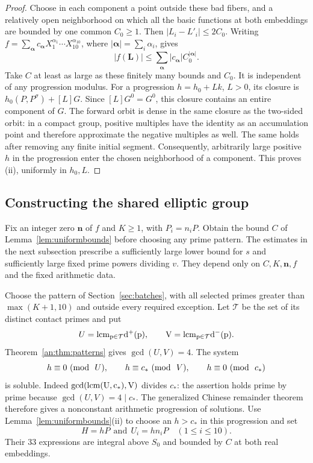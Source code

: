 \documentclass[11pt,reqno]{amsart}
\theoremstyle{definition}
\numberwithin{equation}{section}
\newcommand{\lcm}{\operatorname{lcm}}
\def\t{\text}
\def\mo{{\rm{mod}\ }}
\def\pmod#1{\ (\mo\ #1)}
\def\lcm{\rm{lcm}}
\begin{document}
\begin{proof}
Choose in each component a point outside these bad fibers, and a relatively open neighborhood on which all the basic functions at both embeddings are bounded by one common $C_0\ge1$. Then $|L_i-L'_i|\le2C_0$. Writing $f=\sum_{\boldsymbol\alpha}c_{\boldsymbol\alpha}X_1^{\alpha_1}\cdots X_{10}^{\alpha_{10}}$, where $|\boldsymbol\alpha|=\sum_i\alpha_i$, gives
\[
 |f(\mathbf L)|\le\sum_{\boldsymbol\alpha}|c_{\boldsymbol\alpha}|C_0^{|\boldsymbol\alpha|}.
\]
Take $C$ at least as large as these finitely many bounds and $C_0$. It is independent of any progression modulus. For a progression $h=h_0+Lk$, $L>0$, its closure is $h_0(P,P^\sigma)+[L]G$. Since $[L]G^0=G^0$, this closure contains an entire component of $G$. The forward orbit is dense in the same closure as the two-sided orbit: in a compact group, positive multiples have the identity as an accumulation point and therefore approximate the negative multiples as well. The same holds after removing any finite initial segment. Consequently, arbitrarily large positive $h$ in the progression enter the chosen neighborhood of a component. This proves (ii), uniformly in $h_0,L$.
\end{proof}

\subsection{Constructing the shared elliptic group}
Fix an integer zero $\mathbf n$ of $f$ and $K\ge1$, with $P_i=n_iP$. Obtain the bound $C$ of Lemma~\ref{lem:uniformbounds} before choosing any prime pattern. The estimates in the next subsection prescribe a sufficiently large lower bound for $s$ and sufficiently large fixed prime powers dividing $v$. They depend only on $C,K,\mathbf n,f$ and the fixed arithmetic data.

Choose the pattern of Section~\ref{sec:batches}, with all selected primes greater than $\max(K+1,10)$ and outside every required exception. Let $\mathcal T$ be the set of its distinct contact primes and put
\begin{equation}\label{eq:CRTmoduli}
 U=\lcm_{p\in\mathcal T}d^+(p),\qquad
 V=\lcm_{p\in\mathcal T}d^-(p).
\end{equation}
Theorem~\ref{an:thm:patterns} gives $\gcd(U,V)=4$. The system
\begin{equation}\label{eq:CRT}
 h\equiv0\pmod U,\qquad h\equiv c_\ast\pmod V,
 \qquad h\equiv0\pmod{c_\ast}
\end{equation}
is soluble. Indeed $\gcd(\lcm(U,c_\ast),V)$ divides $c_\ast$: the assertion holds prime by prime because $\gcd(U,V)=4\mid c_\ast$. The generalized Chinese remainder theorem therefore gives a nonconstant arithmetic progression of solutions. Use Lemma~\ref{lem:uniformbounds}(ii) to choose an $h>c_\ast$ in this progression and set
\[
 H=hP\ \ \t{and}\ \  U_i=hn_iP\quad(1\le i\le10).
\]
Their 33 expressions are integral above $S_0$ and bounded by $C$ at both real embeddings.
\end{document}

